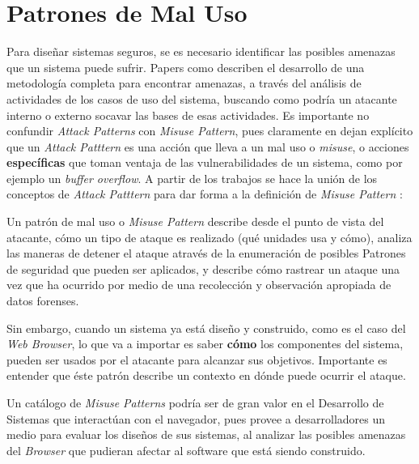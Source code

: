 \section{Patrones de Mal Uso}
Para diseñar sistemas seguros, se es necesario identificar las posibles amenazas que un sistema puede sufrir. Papers como \cite{fernandez2006defining, fernandez2007attack, braz2008eliciting, fernandez2013security} describen el desarrollo de una metodología completa para encontrar amenazas, a través del análisis de actividades de los casos de uso del sistema, buscando como podría un atacante interno o externo socavar las bases de esas actividades. Es importante no confundir \textit{Attack Patterns} con \textit{Misuse Pattern}, pues claramente en \cite{ModMisusePatt, fernandez2013security} dejan explícito que un \textit{Attack Patttern} es una acción que lleva a un mal uso o \textit{misuse}, o acciones \textbf{específicas} que toman ventaja de las vulnerabilidades de un sistema, como por ejemplo un \textit{buffer overflow}. A partir de los trabajos \cite{fernandez2007attack, yoshioka2006development, yoshioka2007integration}  se hace la unión de los conceptos de \textit{Attack Patttern} para dar forma a la definición de \textit{Misuse Pattern} \cite{ModMisusePatt, pelaez2009misuse, fernandez2010worm, hashizume2011misuse, munoz2011misuse, fernandez2012misuse, alkazimi2014, encinamisuse}:
\begin{center}
    Un patrón de mal uso o \textit{Misuse Pattern} describe desde el punto de vista del atacante, cómo un tipo de ataque es realizado (qué unidades usa y cómo), analiza las maneras de detener el ataque através de la enumeración de posibles Patrones de seguridad que pueden ser aplicados, y describe cómo rastrear un ataque una vez que ha ocurrido por medio de una recolección y observación apropiada de datos forenses.
\end{center}

Sin embargo, cuando un sistema ya está diseño y construido, como es el caso del \textit{Web Browser}, lo que va a importar es saber \textbf{cómo} los componentes del sistema, pueden ser usados por el atacante para alcanzar sus objetivos. Importante es entender que éste patrón describe un contexto en dónde puede ocurrir el ataque.

Un catálogo de \textit{Misuse Patterns} podría ser de gran valor en el Desarrollo de Sistemas que interactúan con el navegador, pues provee a desarrolladores un medio para evaluar los diseños de sus sistemas, al analizar las posibles amenazas del \textit{Browser} que pudieran afectar al software que está siendo construido.
